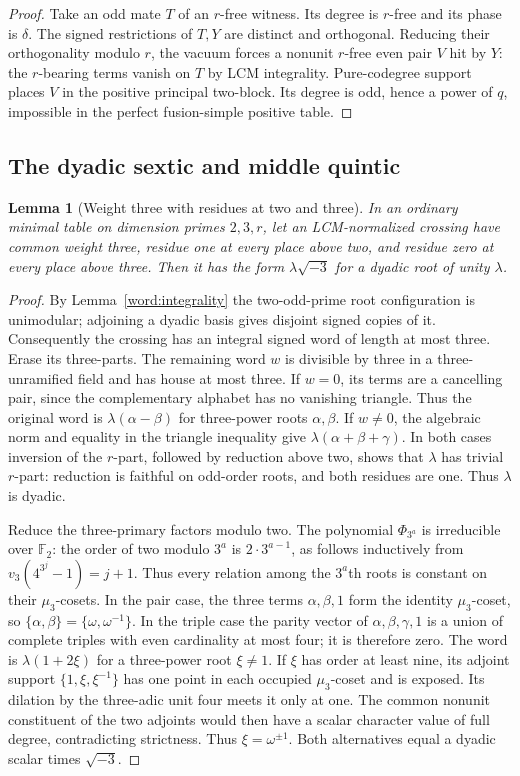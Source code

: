 \documentclass[11pt,a4paper]{article}
\numberwithin{equation}{section}
\newtheorem{lemma}[theorem]{Lemma}
\begin{document}
\begin{proof}
Take an odd mate $T$ of an $r$-free witness. Its degree is
$r$-free and its phase is $\delta$. The signed restrictions
of $T,Y$ are distinct and orthogonal. Reducing their
orthogonality modulo $r$, the vacuum forces a nonunit $r$-free
even pair $V$ hit by $Y$: the $r$-bearing terms vanish on $T$
by LCM integrality. Pure-codegree support places $V$ in the
positive principal two-block. Its degree is odd, hence a power
of $q$, impossible in the perfect fusion-simple positive table.
\end{proof}

\subsection{The dyadic sextic and middle quintic}

\begin{lemma}[Weight three with residues at two and three]
\label{red:ef:weight-three}
In an ordinary minimal table on dimension primes $2,3,r$, let
an LCM-normalized crossing have common weight three, residue one
at every place above two, and residue zero at every place above
three. Then it has the form $\lambda\sqrt{-3}$ for a dyadic
root of unity $\lambda$.
\end{lemma}
\begin{proof}
By Lemma~\ref{word:integrality} the two-odd-prime root configuration is unimodular; adjoining a
dyadic basis gives disjoint signed copies of it. Consequently
the crossing has an integral signed word of length at most three.
Erase its three-parts. The remaining word $w$ is divisible by
three in a three-unramified field and has house at most three.
If $w=0$, its terms are a cancelling pair, since the complementary
alphabet has no vanishing triangle. Thus the original word is
$\lambda(\alpha-\beta)$ for three-power roots $\alpha,\beta$.
If $w\ne0$, the algebraic norm and equality in the triangle
inequality give $\lambda(\alpha+\beta+\gamma)$.
In both cases inversion of the $r$-part, followed by reduction
above two, shows that $\lambda$ has trivial $r$-part: reduction
is faithful on odd-order roots, and both residues are one.
Thus $\lambda$ is dyadic.

Reduce the three-primary factors modulo two. The polynomial
$\Phi_{3^a}$ is irreducible over $\mathbb F_2$: the order of
two modulo $3^a$ is $2\cdot3^{a-1}$, as follows inductively
from $v_3(4^{3^j}-1)=j+1$. Thus every relation among the
$3^a$th roots is constant on their $\mu_3$-cosets. In the pair case,
the three terms $\alpha,\beta,1$ form the identity
$\mu_3$-coset, so $\{\alpha,\beta\}=\{\omega,\omega^{-1}\}$.
In the triple case the parity vector of
$\alpha,\beta,\gamma,1$ is a union of complete triples with
even cardinality at most four; it is therefore zero. The word
is $\lambda(1+2\xi)$ for a three-power root $\xi\ne1$.
If $\xi$ has order at least nine, its adjoint support
$\{1,\xi,\xi^{-1}\}$ has one point in each occupied
$\mu_3$-coset and is exposed. Its dilation by the three-adic
unit four meets it only at one. The common nonunit constituent
of the two adjoints would then have a scalar character value of
full degree, contradicting strictness. Thus $\xi=\omega^{\pm1}$.
Both alternatives equal a dyadic scalar times $\sqrt{-3}$.
\end{proof}
\end{document}
